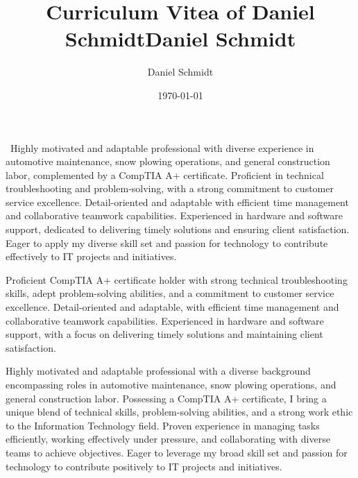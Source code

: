 \documentclass{simplecv}
\title{Curriculum Vitea of Daniel Schmidt}
\author{Daniel Schmidt}
\date{\today}
\begin{document}


\title{Daniel Schmidt}
\maketitle\
Highly motivated and adaptable professional with diverse experience in automotive maintenance, snow plowing operations, and general construction labor, complemented by a CompTIA A+ certificate. Proficient in technical troubleshooting and problem-solving, with a strong commitment to customer service excellence. Detail-oriented and adaptable with efficient time management and collaborative teamwork capabilities. Experienced in hardware and software support, dedicated to delivering timely solutions and ensuring client satisfaction. Eager to apply my diverse skill set and passion for technology to contribute effectively to IT projects and initiatives.

Proficient CompTIA A+ certificate holder with strong technical troubleshooting skills, adept problem-solving abilities, and a commitment to customer service excellence. Detail-oriented and adaptable, with efficient time management and collaborative teamwork capabilities. Experienced in hardware and software support, with a focus on delivering timely solutions and maintaining client satisfaction.

Highly motivated and adaptable professional with a diverse background encompassing roles in automotive maintenance, snow plowing operations, and general construction labor. Possessing a CompTIA A+ certificate, I bring a unique blend of technical skills, problem-solving abilities, and a strong work ethic to the Information Technology field. Proven experience in managing tasks efficiently, working effectively under pressure, and collaborating with diverse teams to achieve objectives. Eager to leverage my broad skill set and passion for technology to contribute positively to IT projects and initiatives.
\end{document}
